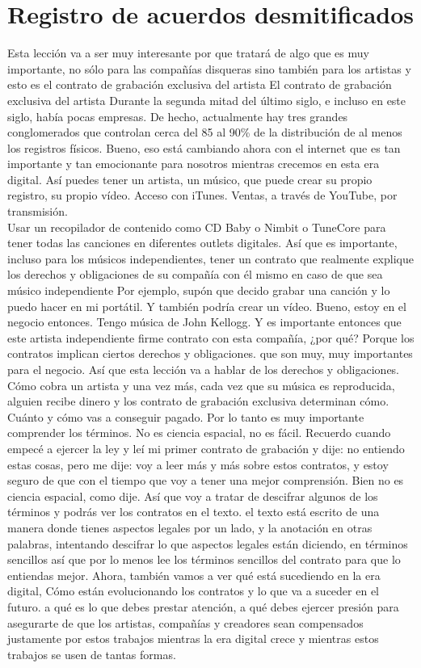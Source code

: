 \documentclass[10pt]{book}
\begin{document}
\section{Registro de acuerdos desmitificados}
Esta lección va a ser muy interesante por que tratará de algo que es muy importante, no sólo para las compañías disqueras sino también para los artistas y esto es el contrato de grabación exclusiva del artista El contrato de grabación exclusiva del artista Durante la segunda mitad del último siglo, e incluso en este siglo, había pocas empresas. De hecho, actualmente hay tres grandes conglomerados que controlan cerca del 85 al 90\% de la distribución de al menos los registros físicos. Bueno, eso está cambiando ahora con el internet que es tan importante y tan emocionante para nosotros mientras crecemos en esta era digital. Así puedes tener un artista, un músico, que puede crear su propio registro, su propio vídeo. Acceso con iTunes. Ventas, a través de YouTube, por transmisión.\\
Usar un recopilador de contenido como CD Baby o Nimbit o TuneCore para tener todas las canciones en diferentes outlets digitales. Así que es importante, incluso para los músicos independientes, tener un contrato que realmente explique los derechos y obligaciones de su compañía con él mismo en caso de que sea músico independiente Por ejemplo, supón que decido grabar una canción y lo puedo hacer en mi portátil. Y también podría crear un vídeo. Bueno, estoy en el negocio entonces. Tengo música de John Kellogg. Y es importante entonces que este artista independiente firme contrato con esta compañía, ¿por qué? Porque los contratos implican ciertos derechos y obligaciones. que son muy, muy importantes para el negocio. Así que esta lección va a hablar de los derechos y obligaciones. Cómo cobra un artista y una vez más, cada vez que su música es reproducida, alguien recibe dinero y los contrato de grabación exclusiva determinan cómo. Cuánto y cómo vas a conseguir pagado. Por lo tanto es muy importante comprender los términos. No es ciencia espacial, no es fácil. Recuerdo cuando empecé a ejercer la ley y leí mi primer contrato de grabación y dije: no entiendo estas cosas, pero me dije: voy a leer más y más sobre estos contratos, y estoy seguro de que con el tiempo que voy a tener una mejor comprensión. Bien no es ciencia espacial, como dije. Así que voy a tratar de descifrar algunos de los términos y podrás ver los contratos en el texto. el texto está escrito de una manera donde tienes aspectos legales por un lado, y la anotación en otras palabras, intentando descifrar lo que aspectos legales están diciendo, en términos sencillos así que por lo menos lee los términos sencillos del contrato para que lo entiendas mejor. Ahora, también vamos a ver qué está sucediendo en la era digital, Cómo están evolucionando los contratos y lo que va a suceder en el futuro. a qué es lo que debes prestar atención, a qué debes ejercer presión para asegurarte de que los artistas, compañías y creadores sean compensados justamente por estos trabajos mientras la era digital crece y mientras estos trabajos se usen de tantas formas.
\end{document}

